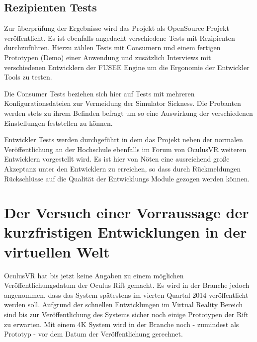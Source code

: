 \documentclass[pagesize, paper=a4, fontsize=12pt,titlepage=true, headings=small, headnosepline, abstractoff, liststotoc, nochapterprefix, plainheadsepline]{scrreprt}
\begin{document}
\section{Rezipienten Tests}
Zur überprüfung der Ergebnisse wird das Projekt als OpenSource Projekt veröffentlicht. Es ist ebenfalls angedacht verschiedene Tests mit Rezipienten durchzuführen. Hierzu zählen Tests mit Consumern und einem fertigen Prototypen (Demo) einer Anwendung und zusätzlich Interviews mit verschiedenen Entwicklern der FUSEE Engine um die Ergonomie der Entwickler Tools zu testen.

Die Consumer Tests beziehen sich hier auf Tests mit mehreren Konfigurationsdateien zur Vermeidung der Simulator Sickness. Die Probanten werden stets zu ihrem Befinden befragt um so eine Auswirkung der verschiedenen Einstellungen feststellen zu können.

Entwickler Tests werden durchgeführt in dem das Projekt neben der normalen Veröffentlichung an der Hochschule ebenfalls im Forum von OculusVR weiteren Entwicklern vorgestellt wird. Es ist hier von Nöten eine ausreichend große Akzeptanz unter den Entwicklern zu erreichen, so dass durch Rückmeldungen Rückschlüsse auf die Qualität der Entwicklungs Module gezogen werden können. 



\chapter{Der Versuch einer Vorraussage der kurzfristigen Entwicklungen in der virtuellen Welt}
OculusVR hat bis jetzt keine Angaben zu einem möglichen Veröffentlichungsdatum der Oculus Rift gemacht. Es wird in der Branche jedoch angenommen, dass das System spätestens im vierten Quartal 2014 veröffentlicht werden soll. Aufgrund der schnellen Entwicklungen im Virtual Reality Bereich sind bis zur Veröffentlichung des Systems sicher noch einige Prototypen der Rift zu erwarten. Mit einem 4K System wird in der Branche noch - zumindest als Prototyp - vor dem Datum der Veröffentlichung gerechnet.
\end{document}

